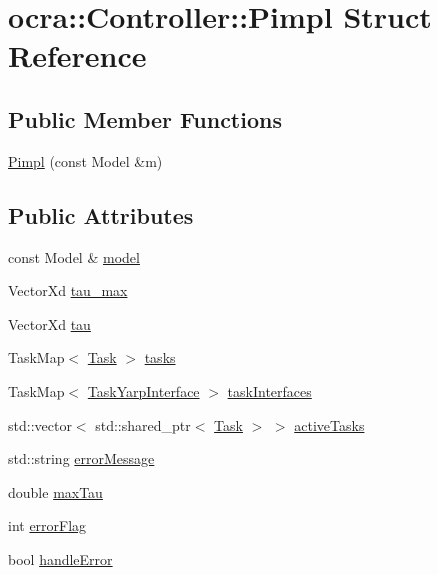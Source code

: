 \hypertarget{structocra_1_1Controller_1_1Pimpl}{}\section{ocra\+:\+:Controller\+:\+:Pimpl Struct Reference}
\label{structocra_1_1Controller_1_1Pimpl}
\subsection*{Public Member Functions}
\begin{DoxyCompactItemize}
\item 
\hyperlink{structocra_1_1Controller_1_1Pimpl_ad59ee786ca8b100a87e797cdfc6c15f5}{Pimpl} (const Model \&m)
\end{DoxyCompactItemize}
\subsection*{Public Attributes}
\begin{DoxyCompactItemize}
\item 
const Model \& \hyperlink{structocra_1_1Controller_1_1Pimpl_aadf5eccdc9453d1f277f62b7becf7390}{model}
\item 
Vector\+Xd \hyperlink{structocra_1_1Controller_1_1Pimpl_a19486bfe59a11231eeabfd3b2b9abd39}{tau\+\_\+max}
\item 
Vector\+Xd \hyperlink{structocra_1_1Controller_1_1Pimpl_a06e7fceb4a0a3c678a4e26fc12946e5c}{tau}
\item 
Task\+Map$<$ \hyperlink{classocra_1_1Task}{Task} $>$ \hyperlink{structocra_1_1Controller_1_1Pimpl_a246fa1cc15ad20293ef78b04dc0dbe70}{tasks}
\item 
Task\+Map$<$ \hyperlink{classocra_1_1TaskYarpInterface}{Task\+Yarp\+Interface} $>$ \hyperlink{structocra_1_1Controller_1_1Pimpl_a396836991948d8d90cf5852330d2c5c3}{task\+Interfaces}
\item 
std\+::vector$<$ std\+::shared\+\_\+ptr$<$ \hyperlink{classocra_1_1Task}{Task} $>$ $>$ \hyperlink{structocra_1_1Controller_1_1Pimpl_a721a40c7b21e230a7508995ecfa93d60}{active\+Tasks}
\item 
std\+::string \hyperlink{structocra_1_1Controller_1_1Pimpl_a1150a44bd413ec025703d53c8eaf4733}{error\+Message}
\item 
double \hyperlink{structocra_1_1Controller_1_1Pimpl_a6731e905858ef90305a3c99c605c8069}{max\+Tau}
\item 
int \hyperlink{structocra_1_1Controller_1_1Pimpl_a8a4ac972687499a277fa08dced73180c}{error\+Flag}
\item 
bool \hyperlink{structocra_1_1Controller_1_1Pimpl_a2764f0bf903a983abae8195ab6639ed5}{handle\+Error}
\end{DoxyCompactItemize}



